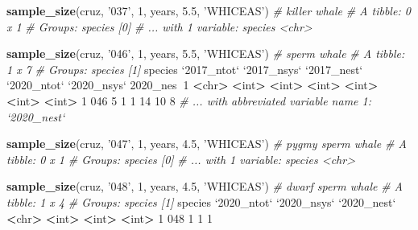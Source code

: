 \documentclass[
]{book}
\newenvironment{Shaded}{\begin{snugshade}}{\end{snugshade}}
\newcommand{\CommentTok}[1]{\textcolor[rgb]{0.56,0.35,0.01}{\textit{#1}}}
\newcommand{\DataTypeTok}[1]{\textcolor[rgb]{0.13,0.29,0.53}{#1}}
\newcommand{\DecValTok}[1]{\textcolor[rgb]{0.00,0.00,0.81}{#1}}
\newcommand{\ErrorTok}[1]{\textcolor[rgb]{0.64,0.00,0.00}{\textbf{#1}}}
\newcommand{\FloatTok}[1]{\textcolor[rgb]{0.00,0.00,0.81}{#1}}
\newcommand{\KeywordTok}[1]{\textcolor[rgb]{0.13,0.29,0.53}{\textbf{#1}}}
\newcommand{\NormalTok}[1]{#1}
\newcommand{\OperatorTok}[1]{\textcolor[rgb]{0.81,0.36,0.00}{\textbf{#1}}}
\newcommand{\StringTok}[1]{\textcolor[rgb]{0.31,0.60,0.02}{#1}}
\begin{document}
\begin{Shaded}
\begin{Highlighting}[]
\KeywordTok{sample_size}\NormalTok{(cruz, }\StringTok{'037'}\NormalTok{, }\DecValTok{1}\NormalTok{, years, }\FloatTok{5.5}\NormalTok{, }\StringTok{'WHICEAS'}\NormalTok{) }\CommentTok{# killer whale}
\CommentTok{# A tibble: 0 x 1}
\CommentTok{# Groups:   species [0]}
\CommentTok{# ... with 1 variable: species <chr>}

\KeywordTok{sample_size}\NormalTok{(cruz, }\StringTok{'046'}\NormalTok{, }\DecValTok{1}\NormalTok{, years, }\FloatTok{5.5}\NormalTok{, }\StringTok{'WHICEAS'}\NormalTok{) }\CommentTok{# sperm whale}
\CommentTok{# A tibble: 1 x 7}
\CommentTok{# Groups:   species [1]}
\NormalTok{  species }\StringTok{`}\DataTypeTok{2017_ntot}\StringTok{`} \StringTok{`}\DataTypeTok{2017_nsys}\StringTok{`} \StringTok{`}\DataTypeTok{2017_nest}\StringTok{`} \StringTok{`}\DataTypeTok{2020_ntot}\StringTok{`} \StringTok{`}\DataTypeTok{2020_nsys}\StringTok{`} \DecValTok{2020}\NormalTok{_nes}\OperatorTok{~}\DecValTok{1}
  \OperatorTok{<}\NormalTok{chr}\OperatorTok{>}\StringTok{         }\ErrorTok{<}\NormalTok{int}\OperatorTok{>}\StringTok{       }\ErrorTok{<}\NormalTok{int}\OperatorTok{>}\StringTok{       }\ErrorTok{<}\NormalTok{int}\OperatorTok{>}\StringTok{       }\ErrorTok{<}\NormalTok{int}\OperatorTok{>}\StringTok{       }\ErrorTok{<}\NormalTok{int}\OperatorTok{>}\StringTok{      }\ErrorTok{<}\NormalTok{int}\OperatorTok{>}
\DecValTok{1} \DecValTok{046}               \DecValTok{5}           \DecValTok{1}           \DecValTok{1}          \DecValTok{14}          \DecValTok{10}          \DecValTok{8}
\CommentTok{# ... with abbreviated variable name 1: `2020_nest`}

\KeywordTok{sample_size}\NormalTok{(cruz, }\StringTok{'047'}\NormalTok{, }\DecValTok{1}\NormalTok{, years, }\FloatTok{4.5}\NormalTok{, }\StringTok{'WHICEAS'}\NormalTok{) }\CommentTok{# pygmy sperm whale}
\CommentTok{# A tibble: 0 x 1}
\CommentTok{# Groups:   species [0]}
\CommentTok{# ... with 1 variable: species <chr>}

\KeywordTok{sample_size}\NormalTok{(cruz, }\StringTok{'048'}\NormalTok{, }\DecValTok{1}\NormalTok{, years, }\FloatTok{4.5}\NormalTok{, }\StringTok{'WHICEAS'}\NormalTok{) }\CommentTok{# dwarf sperm whale}
\CommentTok{# A tibble: 1 x 4}
\CommentTok{# Groups:   species [1]}
\NormalTok{  species }\StringTok{`}\DataTypeTok{2020_ntot}\StringTok{`} \StringTok{`}\DataTypeTok{2020_nsys}\StringTok{`} \StringTok{`}\DataTypeTok{2020_nest}\StringTok{`}
  \OperatorTok{<}\NormalTok{chr}\OperatorTok{>}\StringTok{         }\ErrorTok{<}\NormalTok{int}\OperatorTok{>}\StringTok{       }\ErrorTok{<}\NormalTok{int}\OperatorTok{>}\StringTok{       }\ErrorTok{<}\NormalTok{int}\OperatorTok{>}
\DecValTok{1} \DecValTok{048}               \DecValTok{1}           \DecValTok{1}           \DecValTok{1}


\end{Highlighting}
\end{Shaded}
\end{document}
